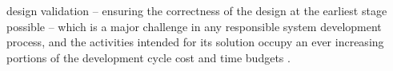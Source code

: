 \documentclass[journal]{IEEEtran}
\begin{document}
% 
%
%
design validation -- ensuring the correctness of the design at the earliest stage possible -- which is a major challenge in any responsible system development process, and the activities intended for its solution occupy an ever increasing portions of the  development cycle cost and time budgets \cite{ClarkeHV18}. 
\end{document}
